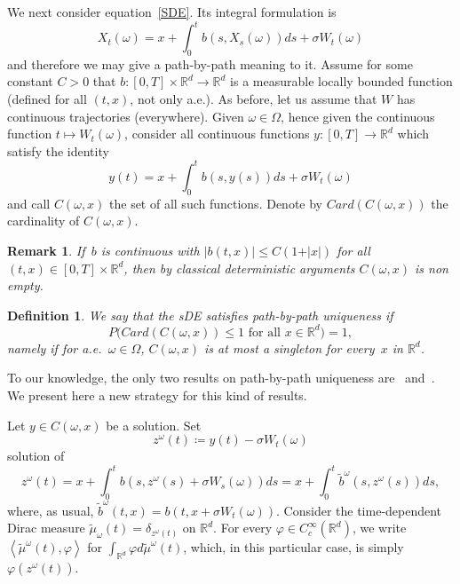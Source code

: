 \documentclass[a4paper,10pt]{article}
\newtheorem{definition}[theorem]{Definition}
\newtheorem{remark}[theorem]{Remark}
\newcommand\1{\mathbbm{1}}
\newcommand{\mr}{\mathbb{R}}
\newcommand{\td}{\tilde}
\numberwithin{equation}{section}
\begin{document}
We next consider equation~\eqref{SDE}. Its integral formulation is 
\begin{equation*}
X_{t}(\omega)  =x+\int_{0}^{t}b(s,X_{s}(\omega)) ds+\sigma W_{t}(\omega)
\end{equation*}
and therefore we may give a path-by-path meaning to it. Assume for some constant $C>0$ that $b \colon [0,T] \times \mathbb{R}^{d} \rightarrow \mathbb{R}^{d}$ is a measurable locally bounded function (defined for all $(t,x)$, not only a.e.). As before, let us assume that $W$ has continuous trajectories (everywhere). Given $\omega\in\Omega$, hence given the continuous function $t\mapsto W_{t}(\omega)$, consider all continuous functions $y \colon [0,T]  \rightarrow \mathbb{R}^{d}$ which satisfy the identity 
\begin{equation*}
y(t)  =x+\int_{0}^{t}b(  s,y(s)  ) ds+\sigma W_{t}(\omega)
\end{equation*}
and call $C(\omega,x)$ the set of all such functions. Denote by $Card(C(\omega,x))$ the cardinality of $C(\omega,x)$.

\begin{remark}
If~$b$ is continuous with $\vert b(  t,x)  \vert \leq C(  1+\vert x\vert )$ for all $(t,x) \in [0,T] \times\mathbb{R}^{d}$, then by classical deterministic arguments $C(\omega,x)$ is non empty.
\end{remark}

\begin{definition}
We say that the sDE satisfies \emph{path-by-path uniqueness} if
\begin{equation*}
P\big(  Card(  C(\omega,x) ) \leq 1 \text{ for all } x\in\mr^d \big)  =1,
\end{equation*}
namely if for a.e.~$\omega \in \Omega$, $C(\omega,x)$ is at most a singleton for every~$x$ in $\mr^d$.
\end{definition}

To our knowledge, the only two results on path-by-path uniqueness are~\cite{DAVIE07} and~\cite{CATGUB13}. We present here a new strategy for this kind of results.

Let $y\in C(\omega,x)$ be a solution. Set
\[
z^\omega(t)  \coloneqq y(t)  -\sigma W_{t}(
\omega)
\]
solution of
\begin{equation*}
z^\omega(t)  =x+\int_{0}^{t}b(s,z^\omega(s)  +\sigma W_{s}(\omega)  )  ds =x+\int_{0}^{t}\widetilde{b}^\omega(s,z^\omega(s))  ds ,
\end{equation*}
where, as usual, $\td{b}^\omega(t,x)=b(t,x+\sigma W_t(\omega))$. Consider the time-dependent Dirac measure $\widetilde{\mu}_{\omega}(t)  =\delta_{z^\omega(t)  }$ on $\mathbb{R}^{d} 
$. For every $\varphi\in C_{c}^{\infty}(\mathbb{R}^{d})$, we write $\left\langle \widetilde{\mu}^\omega(t)  ,\varphi\right\rangle
$ for $\int_{\mathbb{R}^{d}}\varphi d\widetilde{\mu}^\omega(t)$, which, in this particular case, is simply $\varphi(z^\omega(t))$.
\end{document}
